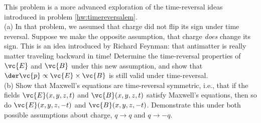         This problem is a more advanced exploration of the time-reversal ideas introduced
        in problem \ref{hw:timereversalem}.\\
        (a) In that problem, we assumed that charge did not flip
        its sign under time reversal. Suppose we make the opposite assumption, that
        charge \emph{does} change its sign. This is an idea introduced by Richard Feynman:
        that antimatter is really matter traveling backward in time! Determine the
        time-reversal properties of $\vc{E}$ and $\vc{B}$ under this new assumption,
        and show that $\der\vc{p}\propto\vc{E}\times\vc{B}$ is still valid under time-reversal.\\
        (b) Show that Maxwell's equations are time-reversal symmetric, i.e., that
        if the fields $\vc{E}(x,y,z,t)$ and $\vc{B}(x,y,z,t)$ satisfy
        Maxwell's equations, then so do  $\vc{E}(x,y,z,-t)$ and $\vc{B}(x,y,z,-t)$.
        Demonstrate this under both possible assumptions about charge, $q\rightarrow q$ and
        $q\rightarrow -q$.

